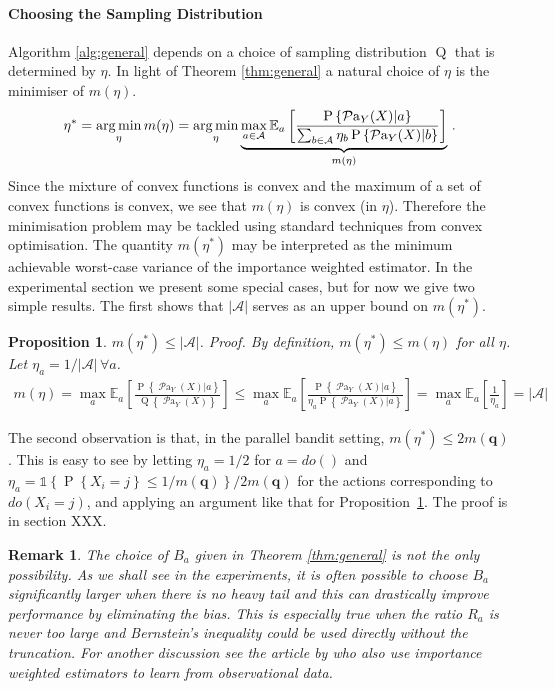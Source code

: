 \documentclass[11pt,a4paper,oneside]{book}
\newcommand{\Q}[1]{\operatorname{Q}\left\{#1\right\}}
\newcommand{\EE}{\mathbb E}
\newcommand{\EEa}{\EE_a}
\newcommand{\Pn}[2]{\operatorname{P}\left\{#2|#1\right\}}
\newcommand{\calA}{\mathcal A}
\newcommand{\set}[1]{\left\{#1\right\}}
\newcommand{\ind}[1]{\mathds{1}\!\!\set{#1}}
\newcommand{\argmin}{\operatornamewithlimits{arg\,min}}
\newcommand{\eq}[1]{\begin{align*}#1\end{align*}}
\renewcommand{\P}[1]{\operatorname{P}\left\{#1\right\}}
\newcommand{\parents}[1]{\operatorname{\mathcal{P}a}_{#1}}
\newtheorem{proposition}[theorem]{Proposition}
\newtheorem{remark}[theorem]{Remark}
\begin{document}
\paragraph{Choosing the Sampling Distribution} Algorithm \ref{alg:general} depends on a choice of sampling distribution $\operatorname{Q}$ that is determined by $\eta$. In light of Theorem \ref{thm:general}
a natural choice of $\eta$ is the minimiser of $m(\eta)$.
\eq{
\eta^* 
= \argmin_\eta m(\eta) = \argmin_\eta \underbrace{\max_{a \in \calA} \EEa \left[\frac{\Pn{a}{\parents{Y}(X)}}{\sum_{b \in \calA} \eta_b \Pn{b}{\parents{Y}(X)}}\right]}_{m(\eta)}\,.
}
Since the mixture of convex functions is convex and the maximum of a set of convex functions is convex, we see that $m(\eta)$ is convex (in $\eta$).
Therefore the minimisation problem may be tackled using standard techniques from convex optimisation. The quantity $m(\eta^*)$ may be interpreted as the minimum achievable worst-case variance of the importance weighted estimator. In the experimental section we present some special cases, but for now we give two simple results. The first shows that $|\calA|$ serves as an upper bound on $m(\eta^*)$.

\begin{proposition}\label{pro:m-bound}
$m(\eta^*) \leq |\calA|$. \textit{Proof.} 
\textup{By definition, $m(\eta^*) \leq m(\eta)$ for all $\eta$. Let $\eta_a = 1/|\calA|\,\forall a$.}
\eq{
m(\eta) 
= \max_a \EEa\left[\frac{\Pn{a}{\parents{Y}(X)}}{\Q{\parents{Y}(X)}}\right] 
\leq \max_a \EEa\left[\frac{\Pn{a}{\parents{Y}(X)}}{\eta_a \Pn{a}{\parents{Y}(X)}}\right] 
= \max_a \EEa\left[\frac{1}{\eta_a}\right] = |\calA| %
}
\end{proposition} 

The second observation is that, in the parallel bandit setting, $m(\eta^*) \leq 2m(\boldsymbol{q})$. This is easy to see by letting $\eta_a = 1/2$ for $a = do()$ and $\eta_a = \ind{\P{X_i = j} \leq 1/m(\boldsymbol{q})} / 2m(\boldsymbol{q})$ for the actions corresponding to $do(X_i=j)$, and applying an argument like that for Proposition~\ref{pro:m-bound}. 
The proof is in section XXX.

\begin{remark}\label{rem:truncate}
The choice of $B_a$ given in Theorem \ref{thm:general} is not the only possibility. As we shall see in the experiments, it is 
often possible to choose $B_a$ significantly
larger when there is no heavy tail and this can drastically improve performance by eliminating the bias. This is especially true when the ratio $R_a$ is never too large
and Bernstein's inequality could be used directly without the truncation. For another discussion see the article by \citet{BJQ13} who also use importance weighted estimators
to learn from observational data.
\end{remark}
\end{document}
